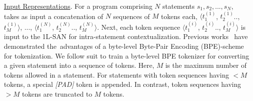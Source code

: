 \vspace{1pt} \underline{Input Representations}. For a program
comprising $N$ statements $s_1, s_2, ..., s_N$, \tool takes as input a
concatenation of $N$ sequences of $M$ tokens each, $\langle
t_1^{(1)}$, $t_2^{(1)}$.., $t_M^{(1)} \rangle$, ..., $\langle
t_1^{(N)}$, $t_2^{(N)}$.., $t_M^{(N)} \rangle$. Next, each token
sequence $\langle t_1^{(i)}$, $t_2^{(i)}$.., $t_M^{(i)} \rangle$ is
input to the 1L-SAN for intra-statement contextualization. Previous
works~\cite{radford2019language, liu2019roberta} have demonstrated
the~advantages of a byte-level Byte-Pair Encoding (BPE)-scheme for
tokenization. We follow suit to train a byte-level BPE tokenizer for
converting a given statement into a sequence of tokens. Here, $M$ is
the maximum number of tokens allowed in a statement.  For statements
with token sequences having ${<}M$ tokens, a special \textit{[PAD]}
token is appended. In contrast, token sequences having ${>}M$ tokens
are truncated to $M$ tokens.





